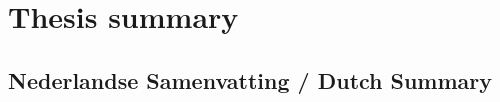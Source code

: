 \chapter{Thesis summary}
\emph{\lipsum[1]}
\section*{Nederlandse Samenvatting / Dutch Summary}
\emph{\lipsum[1]}
\null
\vfill
\newpage